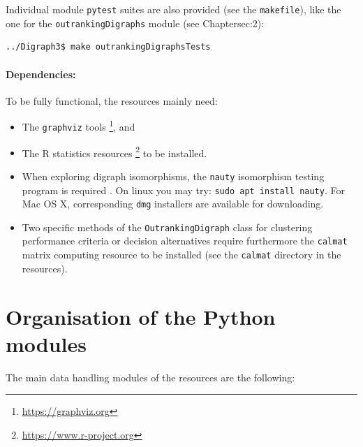 Individual module \texttt{pytest} suites are also provided (see the \texttt{makefile}), like the one for the \texttt{outrankingDigraphs} module (see Chapter{sec:2}):
\begin{lstlisting}[language=sh, backgroundcolor=\color{White}, numbers=none]
../Digraph3$ make outrankingDigraphsTests
\end{lstlisting}

\paragraph{Dependencies:}
To be fully functional, the \Digraph resources mainly need:

\begin{itemize}[leftmargin=0.5cm,listparindent=0em,rightmargin=0.2cm,topsep=1pt]
\item The \texttt{graphviz} tools \citep{graphViz}\footnote{\href{https://graphviz.org}{https://graphviz.org}}, and 
\item The R statistics resources \footnote{\href{https://www.r-project.org}{https://www.r-project.org}} to be installed.
\item When exploring digraph isomorphisms, the \texttt{nauty} isomorphism testing program is required \citep*{nauty}. On linux you may try: \texttt{sudo apt install nauty}. For Mac OS X, corresponding \texttt{dmg} installers are available for downloading.
\item Two specific methods of the \texttt{OutrankingDigraph} class for clustering performance criteria or decision alternatives require furthermore the \texttt{calmat} matrix computing resource to be installed (see the \texttt{calmat} directory in the \Digraph resources).
\end{itemize}

\section{Organisation of the \Digraph Python modules}
\label{sec:1.2}

The main data handling modules of the \Digraph resources are the following:

